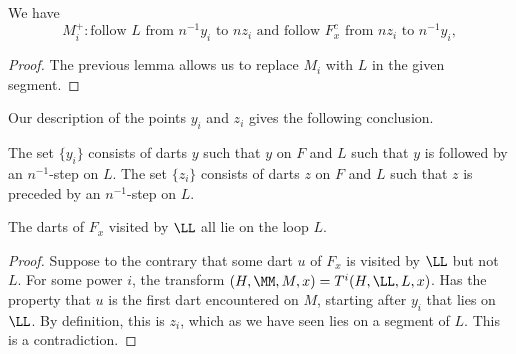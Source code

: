 \begin{lemma} 
We have
\[
M_i^+: \text{follow } L \text{ from } n^{-1} y_i \text{ to } n z_i
  \text{ and follow } F^c_x \text{ from } nz_i \text{ to } n^{-1} y_i,
\]
\end{lemma} 

\begin{proof} The previous lemma allows us to replace $M_i$
with $L$ in the given  segment.
\end{proof}

Our description of the points $y_i$ and $z_i$ gives the following
conclusion.

\begin{lemma} 
The set $\{y_i\}$ consists of darts $y$ such that
$y$ on $F$ and $L$ such that $y$ is followed by an 
$n^{-1}$-step on $L$.
The set $\{z_i\}$ consists of darts $z$ on $F$ and $L$ such that
$z$ is preceded by an $n^{-1}$-step on $L$.
\end{lemma} 

\begin{lemma}
The darts of $F_x$ visited by $\LL$ all lie on the loop $L$.
\end{lemma}

\begin{proof}  Suppose to the contrary that some dart $u$ of $F_x$ is
visited by $\LL$ but not $L$.  For some power $i$, the transform
$(H,\MM,M,x) = T^i(H,\LL,L,x)$. Has the property that $u$ is
the first dart encountered on $M$, starting after $y_i$ that lies on $\LL$.
By definition, this is $z_i$, which as we have seen lies on a segment of
$L$.  This is a contradiction.
\end{proof}






